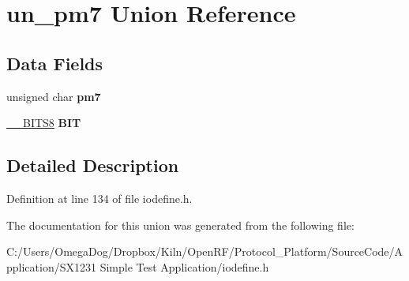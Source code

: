 \hypertarget{unionun__pm7}{\section{un\-\_\-pm7 Union Reference}
\label{unionun__pm7}
}
\subsection*{Data Fields}
\begin{DoxyCompactItemize}
\item 
\hypertarget{unionun__pm7_a6666b22876789f73bb2e8e6b10fbf5ac}{unsigned char {\bfseries pm7}}\label{unionun__pm7_a6666b22876789f73bb2e8e6b10fbf5ac}

\item 
\hypertarget{unionun__pm7_a021df7145842f03f385c7e90018d471e}{\hyperlink{struct_____b_i_t_s8}{\-\_\-\-\_\-\-B\-I\-T\-S8} {\bfseries B\-I\-T}}\label{unionun__pm7_a021df7145842f03f385c7e90018d471e}

\end{DoxyCompactItemize}


\subsection{Detailed Description}


Definition at line 134 of file iodefine.\-h.



The documentation for this union was generated from the following file\-:\begin{DoxyCompactItemize}
\item 
C\-:/\-Users/\-Omega\-Dog/\-Dropbox/\-Kiln/\-Open\-R\-F/\-Protocol\-\_\-\-Platform/\-Source\-Code/\-Application/\-S\-X1231 Simple Test Application/iodefine.\-h\end{DoxyCompactItemize}
